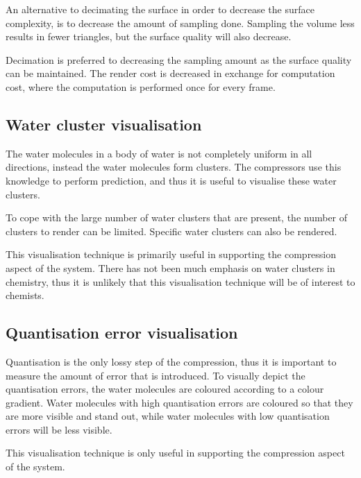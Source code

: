 An alternative to decimating the surface in order to decrease the surface
complexity, is to decrease the amount of sampling done. Sampling the volume
less results in fewer triangles, but the surface quality will also decrease.

Decimation is preferred to decreasing the sampling amount as the surface
quality can be maintained. The render cost is decreased in exchange for
computation cost, where the computation is performed once for every frame.


\subsection{Water cluster visualisation}
\label{sub:design_watercluster}

The water molecules in a body of water is not completely uniform in all
directions, instead the water molecules form clusters. The compressors use this
knowledge to perform prediction, and thus it is useful to visualise these water
clusters.

To cope with the large number of water clusters that are present, the number of
clusters to render can be limited. Specific water clusters can also be rendered.

This visualisation technique is primarily useful in supporting the compression
aspect of the system. There has not been much emphasis on water clusters in
chemistry, thus it is unlikely that this visualisation technique will be of
interest to chemists.


\subsection{Quantisation error visualisation}
\label{sub:design_quanterror}

Quantisation is the only lossy step of the compression, thus it is important to
measure the amount of error that is introduced. To visually depict the
quantisation errors, the water molecules are coloured according to a colour
gradient. Water molecules with high quantisation errors are coloured so that
they are more visible and stand out, while water molecules with low
quantisation errors will be less visible.

This visualisation technique is only useful in supporting the compression aspect
of the system.




